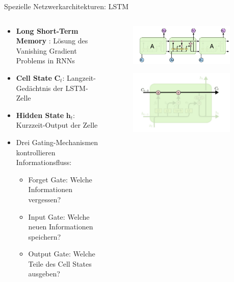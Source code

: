 \documentclass[aspectratio=1610, xcolor=dvipsnames, 9pt]{beamer}
\begin{document}
      \begin{frame}{Spezielle Netzwerkarchitekturen: LSTM}
        \begin{columns}
          \begin{column}{0.6\textwidth}
            \begin{itemize}
              \item \textbf{Long Short-Term Memory} \cite{hochreiter1997}: Lösung des Vanishing Gradient Problems in RNNs \newline
              \item \textbf{Cell State} $\mathbf{C}_t$: Langzeit-Gedächtnis der LSTM-Zelle \newline
              \item \textbf{Hidden State} $\mathbf{h}_t$: Kurzzeit-Output der Zelle \newline
              \item Drei Gating-Mechanismen kontrollieren Informationsfluss:
              \begin{itemize}
                \item Forget Gate: Welche Informationen vergessen?
                \item Input Gate: Welche neuen Informationen speichern?
                \item Output Gate: Welche Teile des Cell States ausgeben?
              \end{itemize}
            \end{itemize}
          \end{column}
           \begin{column}{0.4\textwidth}
             \begin{figure}
               \centering
                           \includegraphics[width=0.9\textwidth]{images/LSTM_1.png}
               \end{figure}
               \begin{figure}
                \centering
                            \includegraphics[width=0.9\textwidth]{images/LSTM_2.png}

\end{figure}
\end{column}
\end{columns}
\end{frame}
\end{document}
